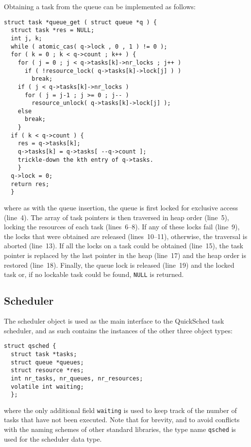 \documentclass[preprint]{elsarticle}
\begin{document}
Obtaining a task from the queue can be implemented as follows:
\begin{center}\begin{minipage}{0.9\textwidth}
    \begin{lstlisting}
struct task *queue_get ( struct queue *q ) {
  struct task *res = NULL;
  int j, k;
  while ( atomic_cas( q->lock , 0 , 1 ) != 0 );
  for ( k = 0 ; k < q->count ; k++ ) {
    for ( j = 0 ; j < q->tasks[k]->nr_locks ; j++ )
      if ( !resource_lock( q->tasks[k]->lock[j] ) )
        break;
    if ( j < q->tasks[k]->nr_locks )
      for ( j = j-1 ; j >= 0 ; j-- )
        resource_unlock( q->tasks[k]->lock[j] );
    else
      break;
    }
  if ( k < q->count ) {
    res = q->tasks[k];
    q->tasks[k] = q->tasks[ --q->count ];
    trickle-down the kth entry of q->tasks.
    }
  q->lock = 0;
  return res;
  }
    \end{lstlisting}
\end{minipage}\end{center}
\noindent where as with the queue insertion, the queue is first
locked for exclusive access (line~4).
The array of task pointers is then traversed in heap order (line~5),
locking the resources of each task (lines~6--8).
If any of these locks fail (line~9), the locks that were obtained
are released (lines~10--11), otherwise, the traversal is aborted
(line~13).
If all the locks on a task could be obtained (line~15), the
task pointer is replaced by the last pointer in the heap (line~17)
and the heap order is restored (line~18).
Finally, the queue lock is released (line~19) and the locked task
or, if no lockable task could be found, {\tt NULL} is returned.


\subsection{Scheduler}

The scheduler object is used as the main interface to the
QuickSched task scheduler, and as such contains the instances
of the other three object types:
\begin{center}\begin{minipage}{0.9\textwidth}
    \begin{lstlisting}
struct qsched {
  struct task *tasks;
  struct queue *queues;
  struct resource *res;
  int nr_tasks, nr_queues, nr_resources;
  volatile int waiting;
  };
    \end{lstlisting}
\end{minipage}\end{center}
\noindent where the only additional field {\tt waiting} is
used to keep track of the number of tasks that have not been
executed.
Note that for brevity, and to avoid conflicts with the naming
schemes of other standard libraries, the type name {\tt qsched}
is used for the scheduler data type.
\end{document}
